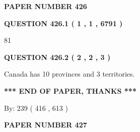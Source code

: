 \documentclass[12pt]{article}
\begin{document}
   
   
   
 {\textbf{ \Large{ PAPER NUMBER  426  }}}
   
   
\vspace{0.2in}
   
   
   
   
   
   
 \vspace{0.2in}
 
 
 
 
   
   
  
\vspace{0.2in}
  
{\textbf{\Large{QUESTION
426.1 
 ( 1 , 1 , 6791 )
}}}
  
  
 
 
\noindent{}

81
 
 
  
\vspace{0.2in}
  
{\textbf{\Large{QUESTION
426.2 
 ( 2 , 2 , 3 )
}}}
  
  
 
 
\noindent{}
 
 
Canada has 10  provinces and 3 territories.
 
 
 
 
   
   
 \vspace{0.2in}
 
   
   
   
   
\vspace{1.0in} 
{\textbf{\large{ *** END OF PAPER, THANKS *** }}} 
   
   
\hspace{1.0in} By: 
 239 ( 416 ,  613 )
   
   
   
   
\newpage 
\setcounter{page}{ 
   427001 } 
   
   
   
   
 {\textbf{ \Large{ PAPER NUMBER  427  }}}
   
   
\vspace{0.2in}
   
\end{document}
